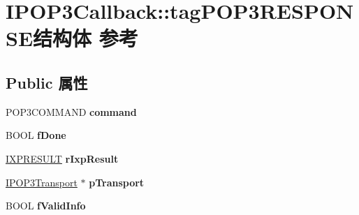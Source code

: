 \hypertarget{struct_i_p_o_p3_callback_1_1tag_p_o_p3_r_e_s_p_o_n_s_e}{}\section{I\+P\+O\+P3\+Callback\+:\+:tag\+P\+O\+P3\+R\+E\+S\+P\+O\+N\+S\+E结构体 参考}
\label{struct_i_p_o_p3_callback_1_1tag_p_o_p3_r_e_s_p_o_n_s_e}
\subsection*{Public 属性}
\begin{DoxyCompactItemize}
\item 
\mbox{\label{struct_i_p_o_p3_callback_1_1tag_p_o_p3_r_e_s_p_o_n_s_e_a62f1af6a689ca7aa3b2b1029a6de7fb3}} 
P\+O\+P3\+C\+O\+M\+M\+A\+ND {\bfseries command}
\item 
\mbox{\label{struct_i_p_o_p3_callback_1_1tag_p_o_p3_r_e_s_p_o_n_s_e_ac3a56a006167792495798019ba008848}} 
B\+O\+OL {\bfseries f\+Done}
\item 
\mbox{\label{struct_i_p_o_p3_callback_1_1tag_p_o_p3_r_e_s_p_o_n_s_e_ac83c30804cbdd6195fa6bd956089761f}} 
\hyperlink{struct_i_transport_callback_1_1tag_i_x_p_r_e_s_u_l_t}{I\+X\+P\+R\+E\+S\+U\+LT} {\bfseries r\+Ixp\+Result}
\item 
\mbox{\label{struct_i_p_o_p3_callback_1_1tag_p_o_p3_r_e_s_p_o_n_s_e_a69c93b6395c671a0ddcb71518e41f303}} 
\hyperlink{class_i_p_o_p3_transport}{I\+P\+O\+P3\+Transport} $\ast$ {\bfseries p\+Transport}
\item 
\mbox{\label{struct_i_p_o_p3_callback_1_1tag_p_o_p3_r_e_s_p_o_n_s_e_a519b277c037efa6b5842669d2bea42dd}} 
B\+O\+OL {\bfseries f\+Valid\+Info}
\item 
\mbox{\label{struct_i_p_o_p3_callback_1_1tag_p_o_p3_r_e_s_p_o_n_s_e_a15cb5bccf5120e20b9c315b736e02e75}} 

\end{DoxyCompactItemize}
